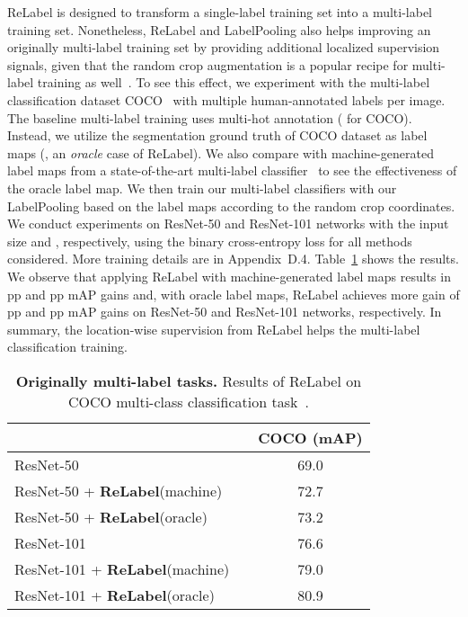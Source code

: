 \documentclass[final]{cvpr}
\newcommand\ours{{{\mbox{ReLabel}}}\xspace}
\newcommand\oursb{{\textbf{\mbox{ReLabel}}}\xspace}
\newcommand\ourframework{{{LabelPooling}}\xspace}
\begin{document}
\ours is designed to transform a single-label training set into a multi-label training set. 
Nonetheless, \ours and \ourframework also helps improving an originally multi-label training set by providing additional localized supervision signals, given that the random crop augmentation is a popular recipe for multi-label training as well~\cite{chen2019multi,wang2017multi,you2020cross}.
To see this effect, we experiment with the multi-label classification dataset COCO~\cite{lin2014microsoft} with multiple human-annotated labels per image. 
The baseline multi-label training uses multi-hot annotation  ( for COCO).
Instead, we utilize the segmentation ground truth of COCO dataset as label maps  (\ie, an \emph{oracle} case of \ours). 
We also compare with {machine}-generated label maps  from a state-of-the-art multi-label classifier~\cite{ben2020asymmetric} to see the effectiveness of the oracle label map.
We then train our multi-label classifiers with our \ourframework based on the label maps according to the random crop coordinates.
We conduct experiments on ResNet-50 and ResNet-101 networks with the input size  and , respectively, using the binary cross-entropy loss for all methods considered.
More training details are in Appendix~D.4. Table~\ref{table:multi-class} shows the results. 
We observe that applying \ours with machine-generated label maps results in  pp and  pp mAP gains and, with oracle label maps, \ours achieves more gain of { pp} and { pp} mAP gains on ResNet-50 and ResNet-101 networks, respectively.
In summary, the location-wise supervision from \ours helps the multi-label classification training.


\begin{table}
\vspace{-0.2cm}
\centering
\tabcolsep=0.12cm
\begin{tabular}{@{}lcc@{}}
\toprule
        & & COCO (mAP) \\
        \midrule
ResNet-50 & & 69.0 \\
ResNet-50 + \oursb (machine) &  &  72.7 \\
ResNet-50 + \oursb (oracle) &  &  73.2 \\ 
        \midrule
ResNet-101 & & 76.6 \\
ResNet-101 + \oursb (machine) &  &  79.0 \\
ResNet-101 + \oursb (oracle) &  &  80.9 \\ 
\bottomrule
\end{tabular}
\caption{\textbf{Originally multi-label tasks.} Results of \ours on COCO multi-class classification task~\cite{lin2014microsoft}.}
\label{table:multi-class}
\vspace{-0.2cm}
\end{table}  
\end{document}
